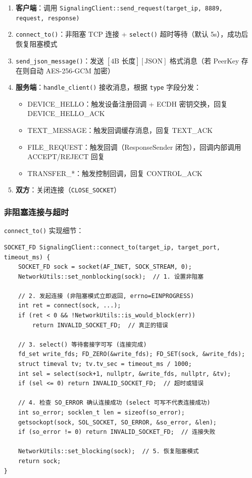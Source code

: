 \documentclass[12pt]{article}
\begin{document}
\begin{enumerate}
    \item \textbf{客户端}：调用 \texttt{SignalingClient::send\_request(target\_ip, 8889, request, response)}
    \item \texttt{connect\_to()}：非阻塞 TCP 连接 + \texttt{select()} 超时等待（默认 5s），成功后恢复阻塞模式
    \item \texttt{send\_json\_message()}：发送 $[4\text{B 长度}][\text{JSON}]$ 格式消息（若 PeerKey 存在则自动 AES-256-GCM 加密）
    \item \textbf{服务端}：\texttt{handle\_client()} 接收消息，根据 \texttt{type} 字段分发：
        \begin{itemize}
            \item DEVICE\_HELLO：触发设备注册回调 + ECDH 密钥交换，回复 DEVICE\_HELLO\_ACK
            \item TEXT\_MESSAGE：触发回调缓存消息，回复 TEXT\_ACK
            \item FILE\_REQUEST：触发回调（ResponseSender 闭包），回调内部调用 ACCEPT/REJECT 回复
            \item TRANSFER\_*：触发控制回调，回复 CONTROL\_ACK
        \end{itemize}
    \item \textbf{双方}：关闭连接（\texttt{CLOSE\_SOCKET}）
\end{enumerate}

\subsubsection{非阻塞连接与超时}

\texttt{connect\_to()} 实现细节：

\begin{lstlisting}[caption={非阻塞 connect + select 超时 (signaling\_client.cpp)}]
SOCKET_FD SignalingClient::connect_to(target_ip, target_port, timeout_ms) {
    SOCKET_FD sock = socket(AF_INET, SOCK_STREAM, 0);
    NetworkUtils::set_nonblocking(sock);  // 1. 设置非阻塞

    // 2. 发起连接 (非阻塞模式立即返回, errno=EINPROGRESS)
    int ret = connect(sock, ...);
    if (ret < 0 && !NetworkUtils::is_would_block(err))
        return INVALID_SOCKET_FD;  // 真正的错误

    // 3. select() 等待套接字可写 (连接完成)
    fd_set write_fds; FD_ZERO(&write_fds); FD_SET(sock, &write_fds);
    struct timeval tv; tv.tv_sec = timeout_ms / 1000;
    int sel = select(sock+1, nullptr, &write_fds, nullptr, &tv);
    if (sel <= 0) return INVALID_SOCKET_FD;  // 超时或错误

    // 4. 检查 SO_ERROR 确认连接成功 (select 可写不代表连接成功)
    int so_error; socklen_t len = sizeof(so_error);
    getsockopt(sock, SOL_SOCKET, SO_ERROR, &so_error, &len);
    if (so_error != 0) return INVALID_SOCKET_FD;  // 连接失败

    NetworkUtils::set_blocking(sock);  // 5. 恢复阻塞模式
    return sock;
}
\end{lstlisting}
\end{document}
